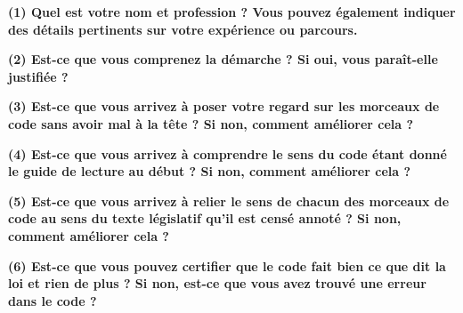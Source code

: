 \documentclass[12pt, french]{article}
\begin{document}
\clearpage

\label{form}
\begin{Form}
  \begin{center}
    \small
  \textbf{(1) Quel est votre nom et profession ? Vous pouvez également indiquer des détails pertinents sur votre expérience ou parcours.}\\[1em]

    \TextField[multiline=true, width=\textwidth]{}
  \end{center}
  \begin{center}
  \textbf{(2) Est-ce que vous comprenez la démarche ? Si oui, vous paraît-elle justifiée ?}\\[1em]

    \TextField[multiline=true, width=\textwidth]{}
  \end{center}
  \begin{center}
  \textbf{(3) Est-ce que vous arrivez à poser votre regard sur les morceaux de code sans avoir mal à la tête ? Si non, comment améliorer cela ?}\\[1em]

    \TextField[multiline=true, width=\textwidth]{}
  \end{center}
  \begin{center}
  \textbf{(4) Est-ce que vous arrivez à comprendre le sens du code étant donné le guide de lecture au début ? Si non, comment améliorer cela ?}\\[1em]

    \TextField[multiline=true, width=\textwidth]{}
  \end{center}
  \begin{center}
  \textbf{(5) Est-ce que vous arrivez à relier le sens de chacun des morceaux de code au sens du texte législatif qu'il est censé annoté ? Si non, comment améliorer cela ?}\\[1em]

    \TextField[multiline=true, width=\textwidth]{}
  \end{center}
  \begin{center}
  \textbf{(6) Est-ce que vous pouvez certifier que le code fait bien ce que dit la loi et rien de plus ? Si non, est-ce que vous avez trouvé une erreur dans le code ? }\\[1em]

    \TextField[multiline=true, width=\textwidth]{}
  \end{center}
\end{Form}
\end{document}
